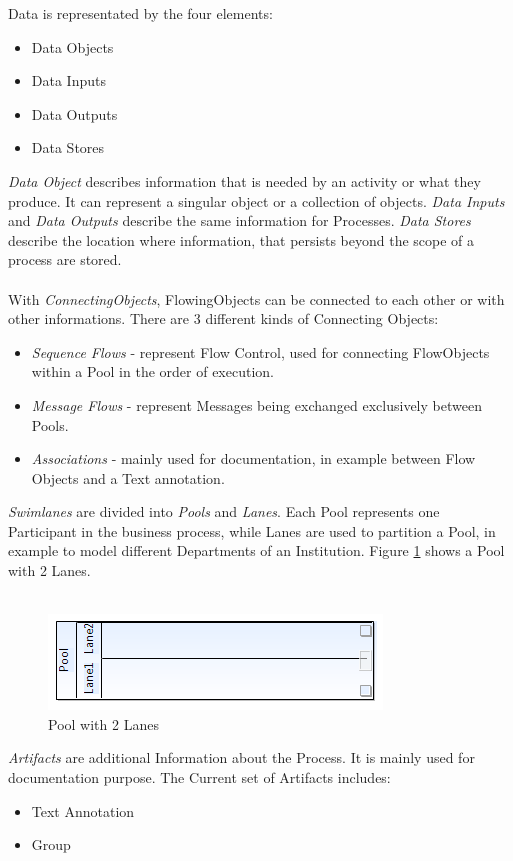 Data is representated by the four elements:
\begin{itemize}
	\item Data Objects
	\item Data Inputs
	\item Data Outputs
	\item Data Stores
\end{itemize}
\textit{Data Object} describes information that is needed by an activity or what they produce. It can represent a singular object or a collection of objects. \textit{Data Inputs} and \textit{Data Outputs} describe the same information for Processes. \textit{Data Stores} describe the location where information, that persists beyond the scope of a process are stored.\\\\
With \textit{ConnectingObjects}, FlowingObjects can be connected to each other or with other informations. There are 3 different kinds of Connecting Objects:
\begin{itemize}
	\item \textit{Sequence Flows} - represent Flow Control, used for connecting FlowObjects within a Pool in the order of execution.
	\item \textit{Message Flows} - represent Messages being exchanged exclusively between Pools.
	\item \textit{Associations} -  mainly used for documentation, in example between Flow Objects and a Text annotation.
\end{itemize}
\textit{Swimlanes} are divided into \textit{Pools} and \textit{Lanes}. Each Pool represents one Participant in the business process, while Lanes are used to partition a Pool, in example to model different Departments of an Institution. Figure \ref{fig:swimlane} shows a Pool with 2 Lanes.\\\\
\begin{figure}[htbp]
	\centering
		\includegraphics{images/swimlane.png}
	\caption{Pool with 2 Lanes}
	\label{fig:swimlane}
\end{figure}

\textit{Artifacts} are additional Information about the Process. It is mainly used for documentation purpose. The Current set of Artifacts includes:
\begin{itemize}
	\item Text Annotation
	\item Group
\end{itemize}


